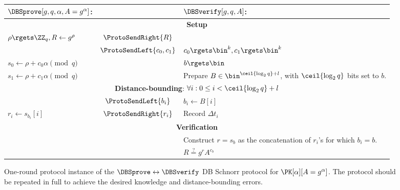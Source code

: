 \begin{figure*}
  \centering
  \begin{tabular}{p{5cm}cp{5cm}}
    \(\DBSprove[g, q, \alpha, A = g^\alpha]\):
    & &
    \(\DBSverify[g, q, A]\):
    \\
    \midrule

    \multicolumn{3}{c}{\textbf{Setup}} \\

    \(\rho\rgets \ZZ_q, R\gets g^{\rho}\)
    & \(\ProtoSendRight{R}\)
    &
    \\

    & \(\ProtoSendLeft{c_0, c_1}\)
    & \(c_0\rgets \bin^k, c_1\rgets \bin^k\)
    \\

    \(s_0\gets \rho + c_0\alpha \pmod q\)
    &
    & \(b\rgets \bin\)
    \\

    \(s_1\gets \rho + c_1\alpha \pmod q\)
    &
    & Prepare \(B\in \bin^{\ceil{\log_2 q}+l}\), with \(\ceil{\log_2 q}\) bits 
    set to \(b\).
    \\

    \midrule
    \multicolumn{3}{c}{\textbf{Distance-bounding}: \(\forall i: 0\leq i < 
        \ceil{\log_2 q} + l\)} \\


    & \(\ProtoSendLeft{b_i}\)
    & \(b_i\gets B[i]\)
    \\

    \(r_i\gets s_{b_i}[i]\)
    & \(\ProtoSendRight{r_i}\)
    & Record \(\Delta t_i\)
    \\

    \midrule
    \multicolumn{3}{c}{\textbf{Verification}}
    \\

    &
    & Construct \(r = s_b\) as the concatenation of \(r_i\)'s for which \(b_i = 
      b\).
    \\

    &
    & \(R \stackrel{?}{=} g^r A^{c_b}\)
    \\
    
  \end{tabular}
  \caption{%
    One-round protocol instance of the \(\DBSprove\leftrightarrow \DBSverify\) \ac{DB} Schnorr protocol for \(\PK[\alpha][A = g^\alpha]\).
    The protocol should be repeated in full to achieve the desired knowledge and distance-bounding errors.
  }%
  \label{SchnorrFigure}
\end{figure*}

